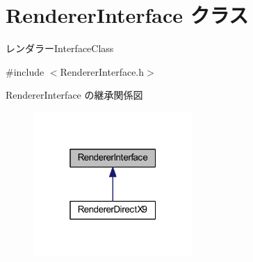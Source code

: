 \hypertarget{class_renderer_interface}{}\section{Renderer\+Interface クラス}
\label{class_renderer_interface}


レンダラー\+Interface\+Class  




{\ttfamily \#include $<$Renderer\+Interface.\+h$>$}



Renderer\+Interface の継承関係図\nopagebreak
\begin{figure}[H]
\begin{center}
\leavevmode
\includegraphics[width=172pt]{class_renderer_interface__inherit__graph}
\end{center}
\end{figure}
